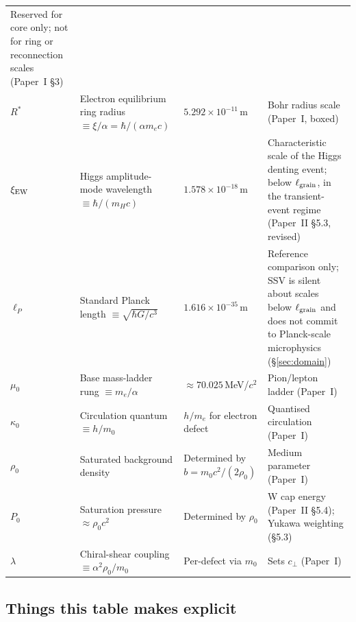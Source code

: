 \documentclass[11pt,a4paper]{article}
\begin{document}
\begin{longtable}{@{}p{2.5cm}p{4.5cm}p{3.5cm}p{4cm}@{}}
        Reserved for core only; not for ring or reconnection scales
        (Paper~I \S3) \\
$R^*$ & Electron equilibrium ring radius $\equiv \xi/\alpha = \hbar/(\alpha m_ec)$ &
        $5.292\times 10^{-11}$\,m & Bohr radius scale (Paper~I, boxed) \\
$\xi_{\rm EW}$ & Higgs amplitude-mode wavelength $\equiv \hbar/(m_H c)$ &
        $1.578\times 10^{-18}$\,m & Characteristic scale of the Higgs
        denting event; below $\ell_{\rm grain}$, in the
        transient-event regime (Paper~II \S5.3, revised) \\
$\ell_P$ & Standard Planck length $\equiv \sqrt{\hbar G/c^3}$ &
        $1.616\times 10^{-35}$\,m &
        Reference comparison only; SSV is silent about scales below
        $\ell_{\rm grain}$ and does not commit to Planck-scale
        microphysics (\S\ref{sec:domain}) \\
\midrule
$\mu_0$ & Base mass-ladder rung $\equiv m_e/\alpha$ &
        $\approx 70.025$\,MeV/$c^2$ &
        Pion/lepton ladder (Paper~I) \\
$\kappa_0$ & Circulation quantum $\equiv h/m_0$ &
        $h/m_e$ for electron defect &
        Quantised circulation (Paper~I) \\
\midrule
$\rho_0$ & Saturated background density &
        Determined by $b = m_0 c^2/(2\rho_0)$ &
        Medium parameter (Paper~I) \\
$P_0$ & Saturation pressure $\approx \rho_0 c^2$ &
        Determined by $\rho_0$ &
        W cap energy (Paper~II \S5.4); Yukawa weighting (\S5.3) \\
$\lambda$ & Chiral-shear coupling $\equiv \alpha^2 \rho_0/m_0$ &
        Per-defect via $m_0$ &
        Sets $c_\perp$ (Paper~I) \\
\bottomrule
\end{longtable}

\subsection{Things this table makes explicit}
\end{document}
